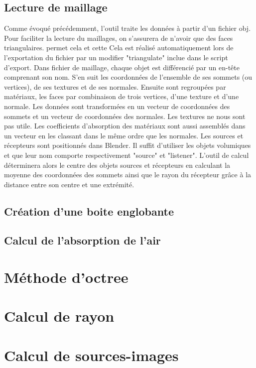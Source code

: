 \subsection{Lecture de maillage}
Comme évoqué précédemment, l'outil traite les données à partir d'un fichier \gls{obj}. Pour faciliter la lecture du maillages, on s'assurera de n'avoir que des faces triangulaires.  permet cela et cette Cela est réalisé automatiquement lors de l'exportation du fichier par un \gls{modifier} "triangulate" inclue dans le script d'export. Dans fichier de maillage, chaque objet est différencié par un en-tête comprenant son nom. S'en suit les coordonnées de l'ensemble de ses sommets (ou vertices), de ses textures et de ses normales. Ensuite sont regroupées par matériaux, les faces par combinaison de trois vertices, d'une texture et d'une normale. Les données sont transformées en un vecteur de coordonnées des sommets et un vecteur de coordonnées des normales. Les textures ne nous sont pas utile. Les coefficients d'absorption des matériaux sont aussi assemblés dans un vecteur en les classant dans le même ordre que les normales.
Les sources et récepteurs sont positionnés dans Blender. Il suffit d'utiliser les objets volumiques et que leur nom comporte respectivement "source" et "listener". L'outil de calcul déterminera alors le centre des objets sources et récepteurs en calculant la moyenne des coordonnées des sommets ainsi que le rayon du récepteur grâce à la distance entre son centre et une extrémité.

\subsection{Création d'une boite englobante}


\subsection{Calcul de l'absorption de l'air}


\section{Méthode d'octree}
\section{Calcul de rayon}
\section{Calcul de sources-images}
